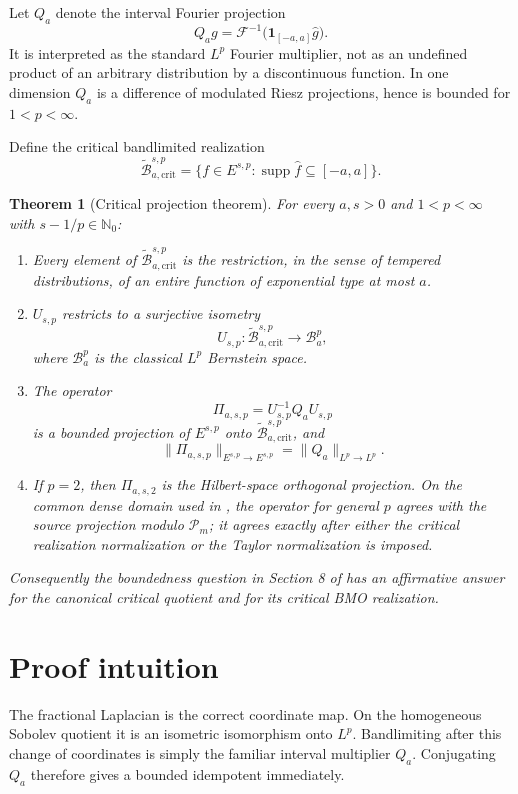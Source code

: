 \documentclass[11pt]{article}
\newtheorem{theorem}{Theorem}
\newcommand{\N}{\mathbb N}
\newcommand{\cF}{\mathcal F}
\newcommand{\cP}{\mathcal P}
\newcommand{\supp}{\operatorname{supp}}
\newcommand{\crit}{\mathrm{crit}}
\begin{document}
Let $Q_a$ denote the interval Fourier projection
\[
  Q_a g=\cF^{-1}\big(\mathbf1_{[-a,a]}\widehat g\big).
\]
It is interpreted as the standard $L^p$ Fourier multiplier, not as an
undefined product of an arbitrary distribution by a discontinuous function.
In one dimension $Q_a$ is a difference of modulated Riesz projections, hence
is bounded for $1<p<\infty$.

Define the critical bandlimited realization
\[
 \widetilde{\mathcal B}^{s,p}_{a,\crit}
 =\big\{f\in E^{s,p}:\supp\widehat f\subseteq[-a,a]\big\}.
\]

\begin{theorem}[Critical projection theorem]\label{thm:main}
For every $a,s>0$ and $1<p<\infty$ with $s-1/p\in\N_0$:
\begin{enumerate}
\item Every element of $\widetilde{\mathcal B}^{s,p}_{a,\crit}$ is the
restriction, in the sense of tempered distributions, of an entire function of
exponential type at most $a$.
\item $U_{s,p}$ restricts to a surjective isometry
\[
 U_{s,p}:\widetilde{\mathcal B}^{s,p}_{a,\crit}
 \longrightarrow \mathcal B_a^p,
\]
where $\mathcal B_a^p$ is the classical $L^p$ Bernstein space.
\item The operator
\[
 \Pi_{a,s,p}=U_{s,p}^{-1}Q_aU_{s,p}
\]
is a bounded projection of $E^{s,p}$ onto
$\widetilde{\mathcal B}^{s,p}_{a,\crit}$, and
\[
 \|\Pi_{a,s,p}\|_{E^{s,p}\to E^{s,p}}
 =\|Q_a\|_{L^p\to L^p}.
\]
\item If $p=2$, then $\Pi_{a,s,2}$ is the Hilbert-space orthogonal
projection. On the common dense domain used in \cite{MPSPW}, the operator for
general $p$ agrees with the source projection modulo $\cP_m$; it agrees
exactly after either the critical realization normalization or the
Taylor normalization is imposed.
\end{enumerate}
Consequently the boundedness question in Section 8 of \cite{MPSPW} has an
affirmative answer for the canonical critical quotient and for its critical
BMO realization.
\end{theorem}

\section{Proof intuition}

The fractional Laplacian is the correct coordinate map. On the homogeneous
Sobolev quotient it is an isometric isomorphism onto $L^p$. Bandlimiting after
this change of coordinates is simply the familiar interval multiplier
$Q_a$. Conjugating $Q_a$ therefore gives a bounded idempotent immediately.
\end{document}
